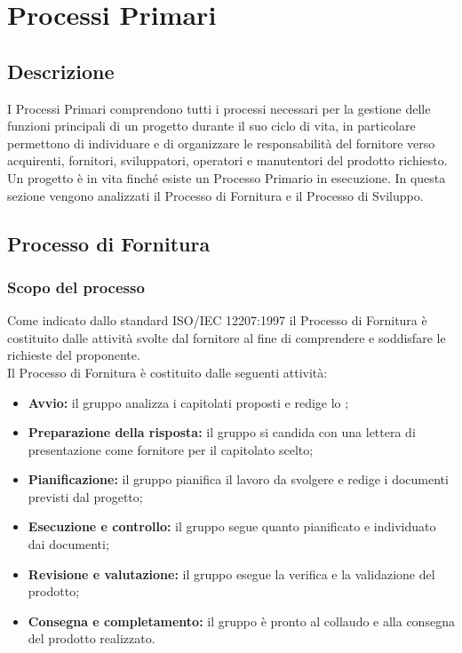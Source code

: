 \section{Processi Primari}
\label{PP}
\subsection{Descrizione}\label{PP_Descrizione}
I Processi Primari comprendono tutti i processi necessari per la gestione delle funzioni principali di un progetto durante il suo ciclo di vita, in particolare permettono di individuare e di organizzare le responsabilità del fornitore verso acquirenti, fornitori, sviluppatori, operatori e manutentori del prodotto richiesto. \\
Un progetto è in vita finché esiste un Processo Primario in esecuzione.
In questa sezione vengono analizzati il Processo di Fornitura e il Processo di Sviluppo.

\subsection{Processo di Fornitura}
\subsubsection{Scopo del processo}\label{PF_Scopo}
Come indicato dallo standard ISO/IEC 12207:1997 il Processo di Fornitura è costituito dalle attività svolte dal fornitore al fine di comprendere e soddisfare le richieste del proponente. \\
Il Processo di Fornitura è costituito dalle seguenti attività:
\begin{itemize}
	\item \textbf{Avvio:} il gruppo analizza i capitolati proposti e redige lo \SdFv;
	\item \textbf{Preparazione della risposta:} il gruppo si candida con una lettera di presentazione come fornitore per il capitolato scelto;
	\item \textbf{Pianificazione:} il gruppo pianifica il lavoro da svolgere e redige i documenti previsti dal progetto;
	\item \textbf{Esecuzione e controllo:} il gruppo segue quanto pianificato e individuato dai documenti;
	\item \textbf{Revisione e valutazione:} il gruppo esegue la verifica e la validazione del prodotto;
	\item \textbf{Consegna e completamento:} il gruppo è pronto al collaudo e alla consegna del prodotto realizzato.
\end{itemize}

